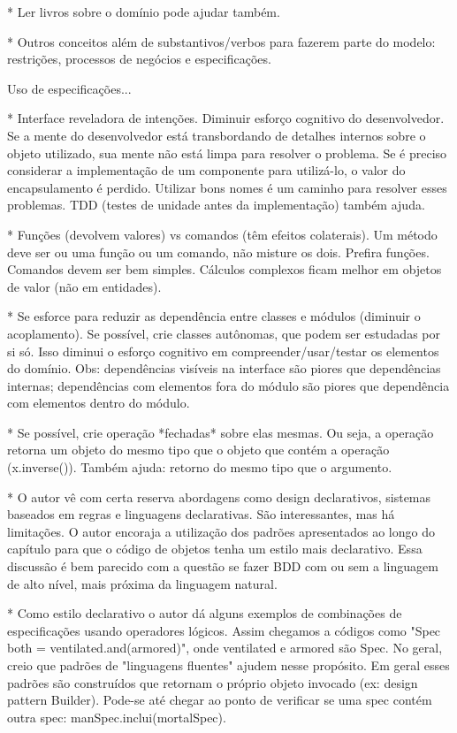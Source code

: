 \documentclass[a4paper, 12pt]{article}
\begin{document}
* Ler livros sobre o domínio pode ajudar também.

* Outros conceitos além de substantivos/verbos para fazerem parte do modelo: restrições, processos de negócios e especificações.

Uso de especificações...

* Interface reveladora de intenções. Diminuir esforço cognitivo do desenvolvedor. Se a mente do desenvolvedor está transbordando de detalhes internos sobre o objeto utilizado, sua mente não está limpa para resolver o problema. Se é preciso considerar a implementação de um componente para utilizá-lo, o valor do encapsulamento é perdido. Utilizar bons nomes é um caminho para resolver esses problemas. TDD (testes de unidade antes da implementação) também ajuda.

* Funções (devolvem valores) vs comandos (têm efeitos colaterais). Um método deve ser ou uma função ou um comando, não misture os dois. Prefira funções. Comandos devem ser bem simples. Cálculos complexos ficam melhor em objetos de valor (não em entidades).

* Se esforce para reduzir as dependência entre classes e módulos (diminuir o acoplamento). Se possível, crie classes autônomas, que podem ser estudadas por si só. Isso diminui o esforço cognitivo em compreender/usar/testar os elementos do domínio. Obs: dependências visíveis na interface são piores que dependências internas; dependências com elementos fora do módulo são piores que dependência com elementos dentro do módulo.

* Se possível, crie operação *fechadas* sobre elas mesmas. Ou seja, a operação retorna um objeto do mesmo tipo que o objeto que contém a operação (x.inverse()). Também ajuda: retorno do mesmo tipo que o argumento.

* O autor vê com certa reserva abordagens como design declarativos, sistemas baseados em regras e linguagens declarativas. São interessantes, mas há limitações. O autor encoraja a utilização dos padrões apresentados ao longo do capítulo para que o código de objetos tenha um estilo mais declarativo. Essa discussão é bem parecido com a questão se fazer BDD com ou sem a linguagem de alto nível, mais próxima da linguagem natural.

* Como estilo declarativo o autor dá alguns exemplos de combinações de especificações usando operadores lógicos. Assim chegamos a códigos como "Spec both = ventilated.and(armored)", onde ventilated e armored são Spec. No geral, creio que padrões de "linguagens fluentes" ajudem nesse propósito. Em geral esses padrões são construídos que retornam o próprio objeto invocado (ex: design pattern Builder). Pode-se até chegar ao ponto de verificar se uma spec contém outra spec: manSpec.inclui(mortalSpec).
\end{document}
